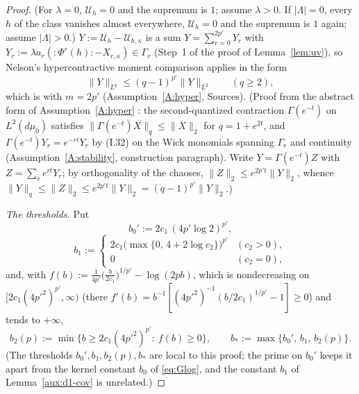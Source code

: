 \documentclass[11pt,a4paper]{article}
\theoremstyle{plain}
\theoremstyle{definition}
\theoremstyle{plain}
\theoremstyle{definition}
\begin{document}
\begin{proof}
(For $\lambda=0$, $\mathcal U_h=0$ and the supremum is $1$; assume $\lambda>0$.  If
$|\Lambda|=0$, every $h$ of the class vanishes almost everywhere, $\mathcal U_h=0$ and the
supremum is $1$ again; assume $|\Lambda|>0$.)
$Y:=\mathcal U_h-\mathcal U_{h,\kappa}$ is a sum $Y=\sum_{r=0}^{2p'}Y_r$ with $Y_r:=\lambda
a_r({:}\Phi^r(h){:}-X_{r,\kappa})\in\Gamma_r$ (Step~1 of the proof of Lemma~\ref{lem:uv}),
so Nelson's hypercontractive moment comparison applies in the form
\[
 \|Y\|_{L^q}\le(q-1)^{p'}\|Y\|_{L^2}\qquad(q\ge2) ,
\]
which is \cite[Thm.~I.22, (I.47), p.~38]{SimonBook} with $m=2p'$ (Assumption~\ref{A:hyper},
Sources).  (Proof from the abstract form of Assumption~\ref{A:hyper} \cite[Thm.~I.17]{SimonBook}:
the second-quantized contraction $\Gamma(e^{-t})$ on $L^2(d\mu_0)$ satisfies
$\|\Gamma(e^{-t})X\|_q\le\|X\|_2$ for $q=1+e^{2t}$, and
$\Gamma(e^{-t})Y_r=e^{-rt}Y_r$ by (I.32) on the Wick monomials spanning $\Gamma_r$ and
continuity (Assumption~\ref{A:stability}, construction paragraph). Write $Y=\Gamma(e^{-t})Z$
with $Z=\sum_re^{rt}Y_r$; by orthogonality of the chaoses, $\|Z\|_2\le e^{2p't}\|Y\|_2$,
whence $\|Y\|_q\le\|Z\|_2\le e^{2p't}\|Y\|_2=(q-1)^{p'}\|Y\|_2$.)

\emph{The thresholds.}  Put
\[
 b_0':=2c_1\,(4p'\log2)^{p'},
\]
\[
 b_1:=\begin{cases}2c_1\bigl(\max\{0,\,4+2\log c_2\}\bigr)^{p'}&(c_2>0),\\
 0&(c_2=0),\end{cases}
\]
and, with $f(b):=\frac1{4p'}\bigl(\frac b{2c_1}\bigr)^{1/p'}-\log(2pb)$, which is
nondecreasing on $[2c_1(4p'^2)^{p'},\infty)$ (there $f'(b)=b^{-1}[(4p'^2)^{-1}(b/2c_1)^{1/p'}
-1]\ge0$) and tends to $+\infty$,
\[
 b_2(p):=\min\bigl\{b\ge2c_1(4p'^2)^{p'}:\ f(b)\ge0\bigr\},\qquad
 b_*:=\max\{b_0',\,b_1,\,b_2(p)\} .
\]
(The thresholds $b_0',b_1,b_2(p),b_*$ are local to this proof; the prime on $b_0'$ keeps
it apart from the kernel constant $b_0$ of \eqref{eq:Glog}, and the constant $b_1$ of
Lemma~\ref{aux:d1-cov} is unrelated.)


\end{proof}
\end{document}

